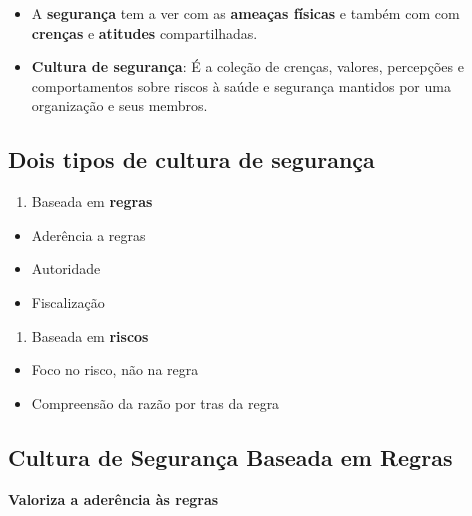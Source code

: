 \documentclass[
  letterpaper,
  DIV=11,
  numbers=noendperiod]{scrartcl}
\providecommand{\tightlist}{%
  \setlength{\itemsep}{0pt}\setlength{\parskip}{0pt}}\usepackage{longtable,booktabs,array}
\begin{document}
\begin{itemize}
\tightlist
\item
  A \textbf{segurança} tem a ver com as \textbf{ameaças físicas} e
  também com com \textbf{crenças} e \textbf{atitudes} compartilhadas.
\item
  \textbf{Cultura de segurança}: É a coleção de crenças, valores,
  percepções e comportamentos sobre riscos à saúde e segurança mantidos
  por uma organização e seus membros.
\end{itemize}

\subsection{Dois tipos de cultura de
segurança}\label{dois-tipos-de-cultura-de-seguranuxe7a}

\begin{enumerate}
\def\labelenumi{\arabic{enumi}.}
\tightlist
\item
  Baseada em \textbf{regras}
\end{enumerate}

\begin{itemize}
\tightlist
\item
  Aderência a regras
\item
  Autoridade
\item
  Fiscalização
\end{itemize}

\begin{enumerate}
\def\labelenumi{\arabic{enumi}.}
\tightlist
\item
  Baseada em \textbf{riscos}
\end{enumerate}

\begin{itemize}
\tightlist
\item
  Foco no risco, não na regra
\item
  Compreensão da razão por tras da regra
\end{itemize}

\subsection{Cultura de Segurança Baseada em
Regras}\label{cultura-de-seguranuxe7a-baseada-em-regras}

\textbf{Valoriza a aderência às regras}
\end{document}
